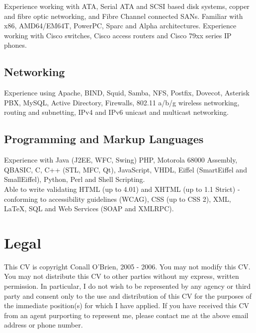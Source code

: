 \documentclass[a4paper, 11pt] {article}
\begin{document}
Experience working with ATA, Serial ATA and SCSI based disk systems, 
copper and fibre optic networking, and Fibre Channel connected SANs. 
Familiar with x86, AMD64/EM64T, PowerPC, Sparc and Alpha architectures. 
Experience working with Cisco switches, Cisco access routers and Cisco 
79xx series IP phones.

\subsection*{Networking}

Experience using Apache, BIND, Squid, Samba, NFS, Postfix, Dovecot,
Asterisk PBX, MySQL, Active  Directory, Firewalls, 802.11 a/b/g wireless 
networking, routing and subnetting, IPv4 and IPv6 unicast and multicast 
networking.
 

\subsection*{Programming and Markup Languages}

Experience with Java (J2EE, WFC, Swing) PHP, Motorola 68000 Assembly, QBASIC,
C, C++ (STL, MFC, Qt), JavaScript, VHDL, Eiffel (SmartEiffel and 
SmallEiffel), Python, Perl and Shell Scripting. \\

Able to write validating HTML (up to 4.01) and XHTML (up 
to 1.1 Strict) - conforming to accessibility guidelines (WCAG), CSS (up to 
CSS 2), XML, LaTeX, SQL and Web Services (SOAP and XMLRPC).

\section*{Legal}

This CV is copyright Conall O'Brien, 2005 - 2006. You may not modify 
this CV. You may not distribute this CV to other parties without my 
express, written permission. In particular, I do not wish to be 
represented by any agency or third party and consent only to the use 
and distribution of this CV for the purposes of the immediate 
position(s) for which I have applied. If you have received this CV from 
an agent purporting to represent me, please contact me at the above 
email address or phone number.
\end{document}
